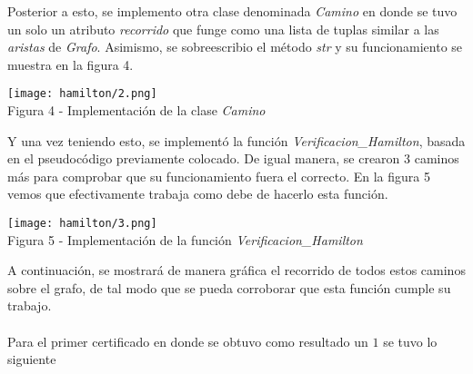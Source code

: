 \documentclass[12pt,twoside]{article}
\begin{document}
Posterior a esto, se implemento otra clase denominada \textit{Camino} en donde se tuvo un solo un atributo \textit{recorrido} que funge como una lista de tuplas similar a las \textit{aristas} de \textit{Grafo}. Asimismo, se sobreescribio el método \textit{str} y su funcionamiento se muestra en la figura 4.
\begin{center}
    \texttt{[image: hamilton/2.png]}\\
    Figura 4 - Implementación de la clase \textit{Camino}
\end{center}
Y una vez teniendo esto, se implementó la función \textit{Verificacion\_Hamilton}, basada en el pseudocódigo previamente colocado. De igual manera, se crearon 3 caminos más para comprobar que su funcionamiento fuera el correcto. En la figura 5 vemos que efectivamente trabaja como debe de hacerlo esta función.
\begin{center}
    \texttt{[image: hamilton/3.png]}\\
    Figura 5 - Implementación de la función \textit{Verificacion\_Hamilton}
\end{center}
A continuación, se mostrará de manera gráfica el recorrido de todos estos caminos sobre el grafo, de tal modo que se pueda corroborar que esta función cumple su trabajo. \\\\
Para el primer certificado en donde se obtuvo como resultado un $1$ se tuvo lo siguiente
\end{document}
